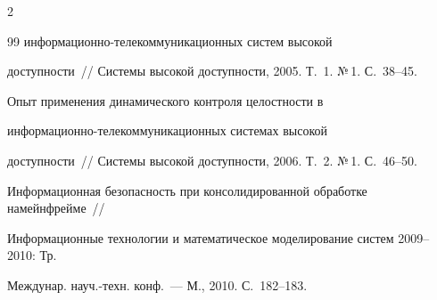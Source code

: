 \begin{multicols}{2}
{{\begin{thebibliography}{99}
ин\-фор\-ма\-ци\-он\-но-те\-ле\-ком\-му\-ни\-ка\-ци\-он\-ных сис\-тем высокой 


доступности~// Системы высокой доступности, 2005. Т.~1. №\,1. С.~38--45.









Опыт применения динамического контроля целостности в 


ин\-фор\-ма\-ци\-он\-но-те\-ле\-ком\-му\-ни\-ка\-ци\-он\-ных сис\-те\-мах высокой 


доступности~// Системы высокой доступности, 2006. Т.~2. №\,1. С.~46--50.





\label{end\stat}









Информационная безопас\-ность при консолидированной обработке на\linebreak мейнфрейме~// 


Информационные технологии и математическое моделирование сис\-тем 2009--2010: Тр. 


Междунар. науч.-техн. конф.~--- М., 2010. С.~182--183.


 \end{thebibliography}


}


}








\end{multicols}


